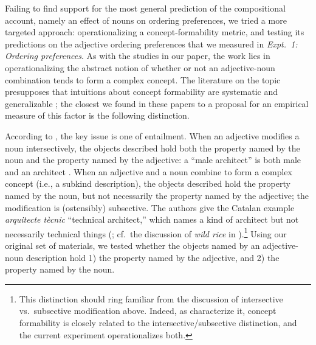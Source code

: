 \documentclass[12pt]{article}
\begin{document}
Failing to find support for the most general prediction of the compositional account, namely an effect of nouns on ordering preferences, we tried a more targeted approach: operationalizing a concept-formability metric, and testing its predictions on the adjective ordering preferences that we measured in \emph{Expt.~1: Ordering preferences}. As with the studies in our paper, the work lies in operationalizing the abstract notion of whether or not an adjective-noun combination tends to form a complex concept. The literature on the topic presupposes that intuitions about concept formability are systematic and generalizable \citep{McNally2004,svenonius2008}; the closest we found in these papers to a proposal for an empirical measure of this factor is the following distinction.

According to \citeauthor{McNally2004}, the key issue is one of entailment. When an adjective modifies a noun intersectively, the objects described hold both the property named by the noun and the property named by the adjective: a ``male architect'' is both male and an architect \citep[p.~179, ex.~2]{McNally2004}. When an adjective and a noun combine to form a complex concept (i.e., a subkind description), the objects described hold the property named by the noun, but not necessarily the property named by the adjective; the modification is (ostensibly) subsective. The authors give the Catalan example \emph{arquitecte t\`{e}cnic} ``technical architect,'' which names a kind of architect but not necessarily technical things (\citealp[p.~179, ex.~1]{McNally2004}; cf.~the discussion of \emph{wild rice} in \citealp{svenonius2008}).\footnote{This distinction should ring familiar from the discussion of intersective vs.~subsective modification above. Indeed, as \citeauthor{McNally2004} characterize it, concept formability is closely related to the intersective/subsective distinction, and the current experiment operationalizes both.} 
Using our original set of materials, we tested whether the objects named by an adjective-noun description hold 1) the property named by the adjective, and 2) the property named by the noun.


\end{document}
